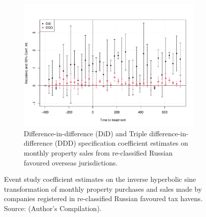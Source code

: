 \documentclass{article}
\begin{document}
\begin{figure}[H]
    \begin{subfigure}[b]{0.8\textwidth}
        \includegraphics[width=\textwidth]{Event_study_Sale_Russia_Robust.pdf}
        \caption{Difference-in-difference (DiD) and Triple difference-in-difference (DDD) specification coefficient estimates on monthly property sales from re-classified Russian favoured overseas jurisdictions.}
        \label{fig:sale-event}
    \end{subfigure}
    \caption{Event study coefficient estimates on the inverse hyperbolic sine transformation of monthly property purchases and sales made by companies registered in re-classified Russian favoured tax havens.  Source: (Author's Compilation).}
    \label{fig:overall-event}
\end{figure}
\end{document}
